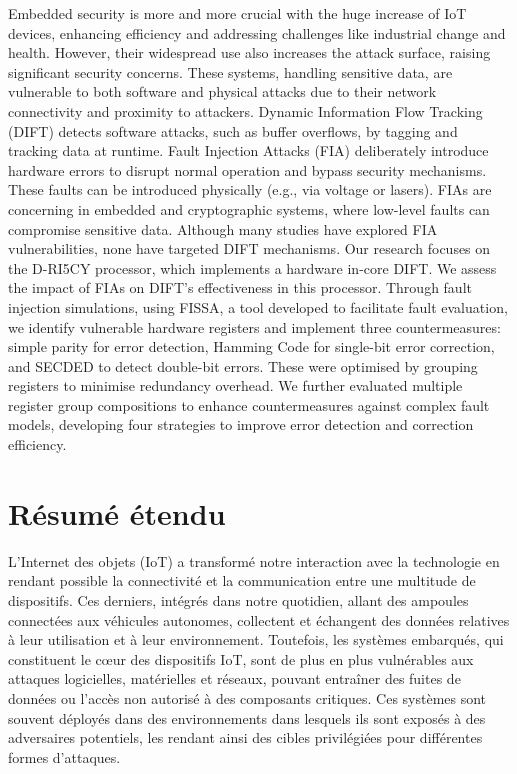Embedded security is more and more crucial with the huge increase of IoT devices, enhancing efficiency and addressing challenges like industrial change and health. However, their widespread use also increases the attack surface, raising significant security concerns. These systems, handling sensitive data, are vulnerable to both software and physical attacks due to their network connectivity and proximity to attackers.
Dynamic Information Flow Tracking (DIFT) detects software attacks, such as buffer overflows, by tagging and tracking data at runtime. Fault Injection Attacks (FIA) deliberately introduce hardware errors to disrupt normal operation and bypass security mechanisms. These faults can be introduced physically (e.g., via voltage or lasers). FIAs are concerning in embedded and cryptographic systems, where low-level faults can compromise sensitive data. Although many studies have explored FIA vulnerabilities, none have targeted DIFT mechanisms.
Our research focuses on the D-RI5CY processor, which implements a hardware in-core DIFT. We assess the impact of FIAs on DIFT's effectiveness in this processor. Through fault injection simulations, using FISSA, a tool developed to facilitate fault evaluation, we identify vulnerable hardware registers and implement three countermeasures: simple parity for error detection, Hamming Code for single-bit error correction, and SECDED to detect double-bit errors. These were optimised by grouping registers to minimise redundancy overhead. We further evaluated multiple register group compositions to enhance countermeasures against complex fault models, developing four strategies to improve error detection and correction efficiency.


\chapter*{Résumé étendu}
\label{chapter:extended_resume}

L'Internet des objets (IoT) a transformé notre interaction avec la technologie en rendant possible la connectivité et la communication entre une multitude de dispositifs. Ces derniers, intégrés dans notre quotidien, allant des ampoules connectées aux véhicules autonomes, collectent et échangent des données relatives à leur utilisation et à leur environnement. Toutefois, les systèmes embarqués, qui constituent le cœur des dispositifs IoT, sont de plus en plus vulnérables aux attaques logicielles, matérielles et réseaux, pouvant entraîner des fuites de données ou l’accès non autorisé à des composants critiques. Ces systèmes sont souvent déployés dans des environnements dans lesquels ils sont exposés à des adversaires potentiels, les rendant ainsi des cibles privilégiées pour différentes formes d'attaques.

